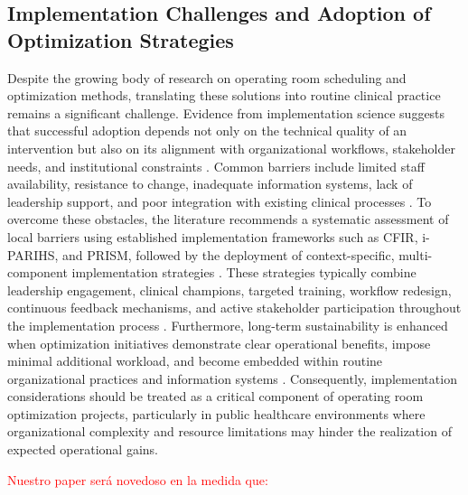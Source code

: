 \documentclass[sn-mathphys-num]{sn-jnl}
\begin{document}
   \subsection*{Implementation Challenges and Adoption of Optimization Strategies}
   Despite the growing body of research on operating room scheduling and optimization methods, translating these solutions into routine clinical practice remains a significant challenge. Evidence from implementation science suggests that successful adoption depends not only on the technical quality of an intervention but also on its alignment with organizational workflows, stakeholder needs, and institutional constraints \cite{Lam2021,Roberts2020,Wang2023}. Common barriers include limited staff availability, resistance to change, inadequate information systems, lack of leadership support, and poor integration with existing clinical processes \cite{Nair2024,PetersCorbett2023,Sendak2020}. To overcome these obstacles, the literature recommends a systematic assessment of local barriers using established implementation frameworks such as CFIR, i-PARIHS, and PRISM, followed by the deployment of context-specific, multi-component implementation strategies \cite{Lam2021,Roberts2020,Byhoff2023,Yakovchenko2023}. These strategies typically combine leadership engagement, clinical champions, targeted training, workflow redesign, continuous feedback mechanisms, and active stakeholder participation throughout the implementation process \cite{Tong2024,Teggart2024,Ramirez2024,Hassett2024}. Furthermore, long-term sustainability is enhanced when optimization initiatives demonstrate clear operational benefits, impose minimal additional workload, and become embedded within routine organizational practices and information systems \cite{Nair2024,Varsi2019,Eisner2025}. Consequently, implementation considerations should be treated as a critical component of operating room optimization projects, particularly in public healthcare environments where organizational complexity and resource limitations may hinder the realization of expected operational gains.


\textcolor{red}{
Nuestro paper será novedoso en la medida que:
}
\end{document}
